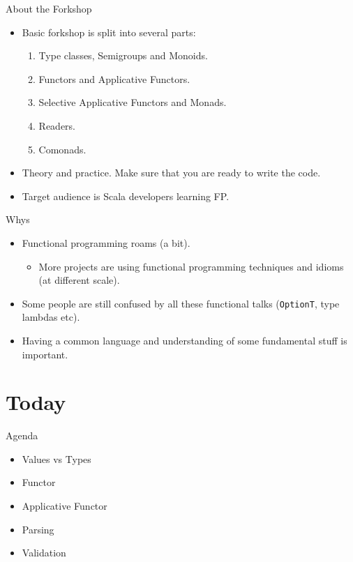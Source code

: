 \documentclass[presentation,aspectratio=169,smaller]{beamer}
\begin{document}
\begin{frame}[label={sec:org4515270}]{About the Forkshop}
\begin{itemize}
\item Basic forkshop is split into several parts:
\begin{enumerate}
\item Type classes, Semigroups and Monoids.
\item Functors and Applicative Functors.
\item Selective Applicative Functors and Monads.
\item Readers.
\item Comonads.
\end{enumerate}
\item Theory and practice. Make sure that you are ready to write the code.
\item Target audience is Scala developers learning FP.
\end{itemize}
\end{frame}

\begin{frame}[label={sec:org0703ad4},fragile]{Whys}
 \begin{itemize}
\item <1-> Functional programming roams (a bit).
\begin{itemize}
\item More projects are using functional programming techniques and idioms (at
different scale).
\end{itemize}
\item <2-> Some people are still confused by all these functional talks (\texttt{OptionT}, type
lambdas etc).
\item <3-> Having a common language and understanding of some fundamental stuff is
important.
\end{itemize}
\end{frame}

\section*{Today}
\label{sec:org8e3b9b7}
\begin{frame}[label={sec:orgcf0b4fc}]{Agenda}
\begin{itemize}
\item Values vs Types
\item Functor
\item Applicative Functor
\item Parsing
\item Validation
\end{itemize}
\end{frame}
\end{document}
